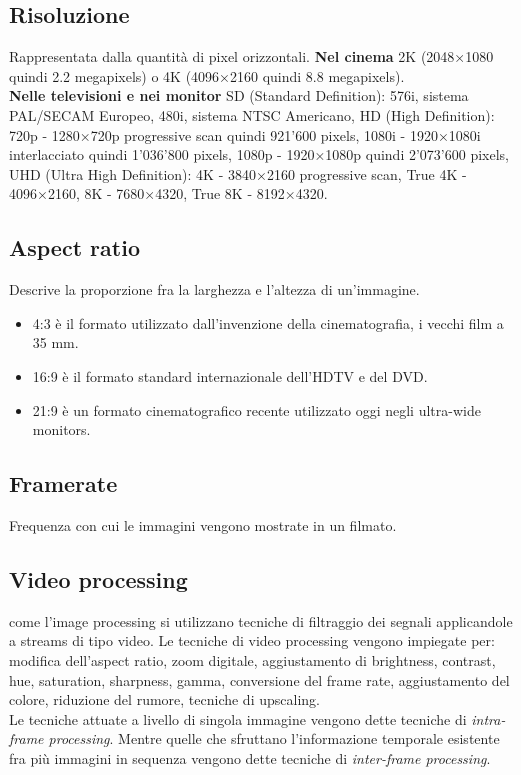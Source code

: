 \documentclass[8pt,a4paper]{article}
\begin{document}
\begin{multicols}{5}
    \subsection{Risoluzione}
    Rappresentata dalla quantità di pixel orizzontali. 
      \textbf{Nel cinema} 2K (2048×1080 quindi 2.2 megapixels) o 4K (4096×2160 quindi 
      8.8 megapixels). \\
      \textbf{Nelle televisioni e nei monitor} SD (Standard Definition): 576i, sistema 
      PAL/SECAM Europeo, 480i, sistema NTSC Americano, HD (High Definition): 720p - 
      1280×720p progressive scan quindi 921’600 pixels, 1080i - 1920×1080i interlacciato 
      quindi 1’036’800 pixels, 1080p - 1920×1080p quindi 2’073’600 pixels, UHD (Ultra 
      High Definition): 4K - 3840×2160 progressive scan, True 4K - 4096×2160, 8K - 
      7680×4320, True 8K - 8192×4320.
    \subsection{Aspect ratio}
    Descrive la proporzione fra la larghezza e l’altezza di un’immagine.
    \begin{itemize}
      \item 4:3 è il formato utilizzato dall’invenzione della cinematografia, i vecchi 
      film a 35 mm.
      \item 16:9 è il formato standard internazionale dell’HDTV e del DVD.
      \item 21:9 è un formato cinematografico recente utilizzato oggi negli 
      ultra-wide monitors.
    \end{itemize}
    
    \subsection{Framerate}
    Frequenza con cui le immagini vengono mostrate in un filmato. 

    \subsection{Video processing}  come l’image processing si utilizzano tecniche di 
    filtraggio dei segnali applicandole a streams di tipo video. Le tecniche di video 
    processing vengono impiegate per: modifica dell’aspect ratio, zoom digitale, 
    aggiustamento di brightness, contrast, hue, saturation, sharpness, gamma, 
    conversione del frame rate, aggiustamento del colore, riduzione del rumore, 
    tecniche di upscaling. \\
    Le tecniche attuate a livello di singola immagine vengono dette tecniche di 
    \textit{intra-frame processing}. Mentre quelle che sfruttano l’informazione 
    temporale esistente fra più immagini in sequenza vengono dette tecniche di 
    \textit{inter-frame processing}.


\end{multicols}
\end{document}

